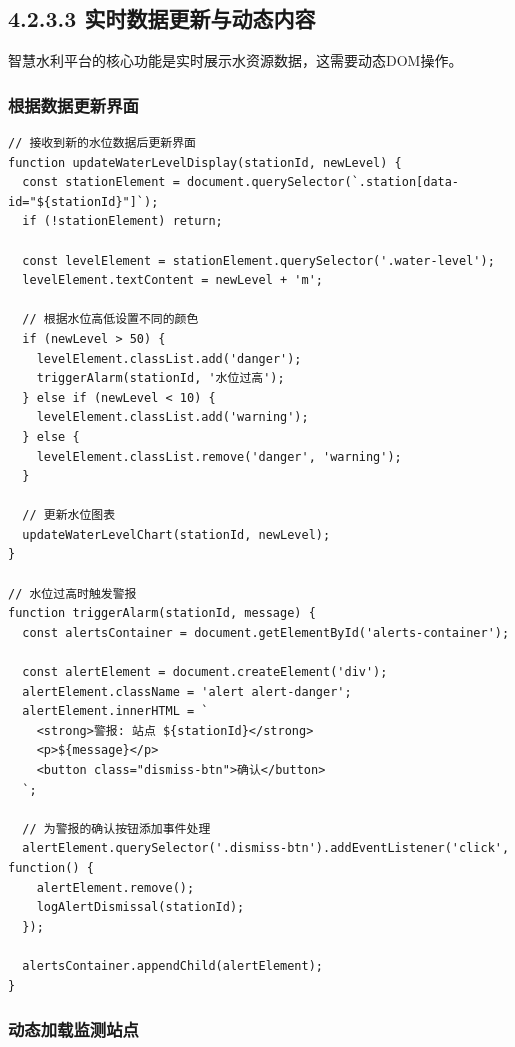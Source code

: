 \subsection{4.2.3.3
实时数据更新与动态内容}\label{ux5b9eux65f6ux6570ux636eux66f4ux65b0ux4e0eux52a8ux6001ux5185ux5bb9}

智慧水利平台的核心功能是实时展示水资源数据，这需要动态DOM操作。

\subsubsection{根据数据更新界面}\label{ux6839ux636eux6570ux636eux66f4ux65b0ux754cux9762}

\begin{lstlisting}
// 接收到新的水位数据后更新界面
function updateWaterLevelDisplay(stationId, newLevel) {
  const stationElement = document.querySelector(`.station[data-id="${stationId}"]`);
  if (!stationElement) return;
  
  const levelElement = stationElement.querySelector('.water-level');
  levelElement.textContent = newLevel + 'm';
  
  // 根据水位高低设置不同的颜色
  if (newLevel > 50) {
    levelElement.classList.add('danger');
    triggerAlarm(stationId, '水位过高');
  } else if (newLevel < 10) {
    levelElement.classList.add('warning');
  } else {
    levelElement.classList.remove('danger', 'warning');
  }
  
  // 更新水位图表
  updateWaterLevelChart(stationId, newLevel);
}

// 水位过高时触发警报
function triggerAlarm(stationId, message) {
  const alertsContainer = document.getElementById('alerts-container');
  
  const alertElement = document.createElement('div');
  alertElement.className = 'alert alert-danger';
  alertElement.innerHTML = `
    <strong>警报: 站点 ${stationId}</strong>
    <p>${message}</p>
    <button class="dismiss-btn">确认</button>
  `;
  
  // 为警报的确认按钮添加事件处理
  alertElement.querySelector('.dismiss-btn').addEventListener('click', function() {
    alertElement.remove();
    logAlertDismissal(stationId);
  });
  
  alertsContainer.appendChild(alertElement);
}
\end{lstlisting}

\subsubsection{动态加载监测站点}\label{ux52a8ux6001ux52a0ux8f7dux76d1ux6d4bux7ad9ux70b9}

